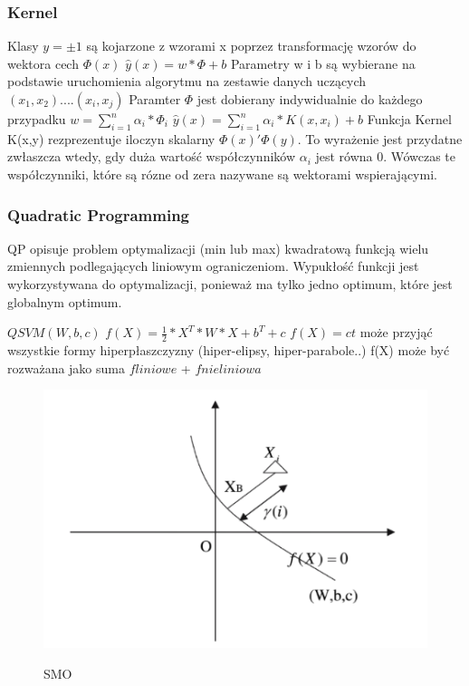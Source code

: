 \documentclass[[10pt,a4paper]{article}
\begin{document}
\subsubsection{Kernel}
Klasy $y=\pm 1$ są kojarzone z wzorami x poprzez transformację wzorów do wektora cech $\Phi(x)$
\newline
$\widehat{y}(x) = w*\Phi+b$ 
\newline
Parametry w i b są wybierane na podstawie uruchomienia algorytmu na zestawie danych uczących $(x_1,x_2)....(x_i,x_j)$
\newline 
Paramter $\Phi$ jest dobierany indywidualnie do każdego przypadku
\newline
$w = \sum_{i=1}^{n}\alpha_i*\Phi_i $
\newline
$\widehat{y}(x) =  \sum_{i=1}^{n}\alpha_i*K(x,x_i)+b$
\newline
Funkcja Kernel K(x,y) rezprezentuje iloczyn skalarny $\Phi(x)'\Phi(y) $. To wyrażenie jest przydatne zwłaszcza wtedy, gdy duża wartość współczynników $\alpha_i$ jest równa 0. Wówczas te współczynniki, które są rózne od zera nazywane są wektorami wspierającymi. 

\subsubsection{Quadratic Programming}
QP opisuje problem optymalizacji (min lub max) kwadratową funkcją wielu zmiennych podlegających liniowym ograniczeniom. Wypukłość funkcji jest wykorzystywana do optymalizacji, ponieważ ma tylko jedno optimum, które jest globalnym optimum. 



$QSVM (W,b,c)$
$f(X)=\frac{1}{2}*X^T*W*X+b^T+c$
$f(X)=ct$ może przyjąć wszystkie formy hiperpłaszczyzny (hiper-elipsy, hiper-parabole..)
f(X) może być rozważana jako suma $fliniowe$ + $fnieliniowa$

\begin{figure}[h]
\centering
\includegraphics{3.png}\\
\caption{SMO}
\end{figure}
\end{document}
